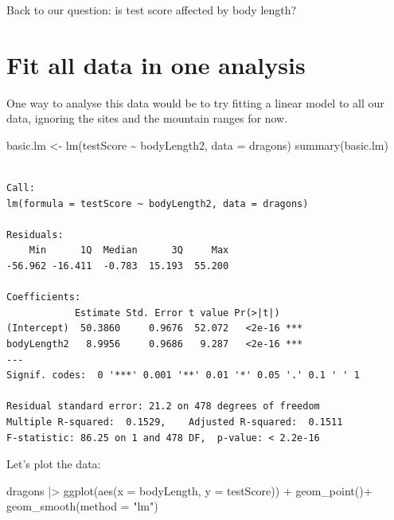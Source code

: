\documentclass[
  letterpaper,
  DIV=11,
  numbers=noendperiod]{scrreprt}
\newenvironment{Shaded}{\begin{snugshade}}{\end{snugshade}}
\newcommand{\AttributeTok}[1]{\textcolor[rgb]{0.40,0.45,0.13}{#1}}
\newcommand{\FunctionTok}[1]{\textcolor[rgb]{0.28,0.35,0.67}{#1}}
\newcommand{\NormalTok}[1]{\textcolor[rgb]{0.00,0.23,0.31}{#1}}
\newcommand{\OtherTok}[1]{\textcolor[rgb]{0.00,0.23,0.31}{#1}}
\newcommand{\SpecialCharTok}[1]{\textcolor[rgb]{0.37,0.37,0.37}{#1}}
\newcommand{\StringTok}[1]{\textcolor[rgb]{0.13,0.47,0.30}{#1}}
\begin{document}
Back to our question: is test score affected by body length?

\section{Fit all data in one
analysis}\label{fit-all-data-in-one-analysis}

One way to analyse this data would be to try fitting a linear model to
all our data, ignoring the sites and the mountain ranges for now.

\begin{Shaded}
\begin{Highlighting}[]
\NormalTok{basic.lm }\OtherTok{\textless{}{-}} \FunctionTok{lm}\NormalTok{(testScore }\SpecialCharTok{\textasciitilde{}}\NormalTok{ bodyLength2, }\AttributeTok{data =}\NormalTok{ dragons)}
\FunctionTok{summary}\NormalTok{(basic.lm)}
\end{Highlighting}
\end{Shaded}

\begin{verbatim}

Call:
lm(formula = testScore ~ bodyLength2, data = dragons)

Residuals:
    Min      1Q  Median      3Q     Max 
-56.962 -16.411  -0.783  15.193  55.200 

Coefficients:
            Estimate Std. Error t value Pr(>|t|)    
(Intercept)  50.3860     0.9676  52.072   <2e-16 ***
bodyLength2   8.9956     0.9686   9.287   <2e-16 ***
---
Signif. codes:  0 '***' 0.001 '**' 0.01 '*' 0.05 '.' 0.1 ' ' 1

Residual standard error: 21.2 on 478 degrees of freedom
Multiple R-squared:  0.1529,    Adjusted R-squared:  0.1511 
F-statistic: 86.25 on 1 and 478 DF,  p-value: < 2.2e-16
\end{verbatim}

Let's plot the data:

\begin{Shaded}
\begin{Highlighting}[]
\NormalTok{dragons }\SpecialCharTok{|\textgreater{}}
  \FunctionTok{ggplot}\NormalTok{(}\FunctionTok{aes}\NormalTok{(}\AttributeTok{x =}\NormalTok{ bodyLength, }\AttributeTok{y =}\NormalTok{ testScore)) }\SpecialCharTok{+}
  \FunctionTok{geom\_point}\NormalTok{()}\SpecialCharTok{+}
  \FunctionTok{geom\_smooth}\NormalTok{(}\AttributeTok{method =} \StringTok{"lm"}\NormalTok{)}
\end{Highlighting}
\end{Shaded}
\end{document}
